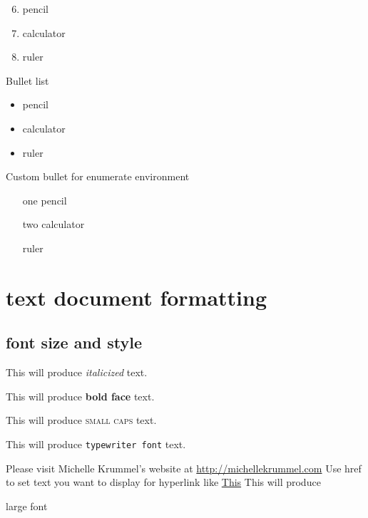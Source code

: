\documentclass[12pt,a4paper]{article}
\begin{document}
\vspace{1cm}
\begin{enumerate} \setcounter{enumi}{5} %
	\item pencil
	\item calculator
	\item ruler
\end{enumerate}
Bullet list
\begin{itemize} %
	\item pencil
	\item calculator
	\item ruler
\end{itemize}
Custom bullet for enumerate environment
\begin{enumerate} %
	\item[one] pencil %
	\item[two] calculator
	\item[] ruler
\end{enumerate}
\pagebreak

\section{text document formatting}
\subsection{font size and style}
This will produce \textit{italicized} text.

This will produce \textbf{bold face} text.

This will produce \textsc{small caps} text.

This will produce \texttt{typewriter font} text.

Please visit Michelle Krummel's website at \url{http://michellekrummel.com} %
Use href to set text you want to display for hyperlink like \href{http://michellekrummel.com}{This}
\vspace{1cm}
This will produce \begin{large}large font\end{large}
\end{document}
